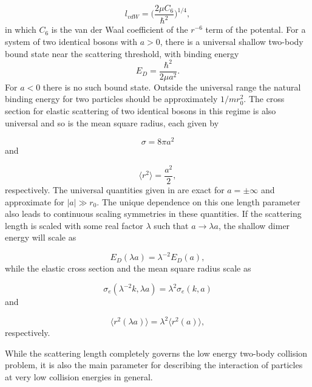 \documentclass{article}
\providecommand{\abs}[1]{\lvert#1\rvert} \providecommand{\norm}[1]{\lVert#1\rVert}
\numberwithin{equation}{section}
\numberwithin{figure}{section}
\begin{document}
\begin{equation}
l_{vdW} = \bigg(\frac{2\mu C_6}{\hbar^2}\bigg)^{1/4},
\end{equation}
in which $C_6$ is the van der Waal coefficient of the $r^{-6}$ term of the potental. For a system of two identical bosons with $a>0$, there is a universal shallow two-body bound state near the scattering threshold, with binding energy 
\begin{equation}\label{shallowdimer}
E_D = \frac{\hbar^2}{2 \mu a^2}.
\end{equation}
For $a<0$ there is no such bound state. Outside the universal range the natural binding energy for two particles should be approximately $1/mr_0^2$. The cross section for elastic scattering of two identical bosons in this regime is also universal and so is the mean square radius, each given by

\begin{equation}\label{elasticcross}
\sigma = 8\pi a^2
\end{equation}
and

\begin{equation}\label{meanradius}
\langle r^2\rangle = \frac{a^2}{2},
\end{equation}
respectively. The universal quantities given in  are exact for $a=\pm \infty$ and approximate for $\abs{a}\gg r_0$. The unique dependence on this one length parameter also leads to continuous scaling symmetries in these quantities. If the scattering length is scaled with some real factor $\lambda$ such that $a \to \lambda a$, the shallow dimer energy will scale as 

\begin{equation}
E_D(\lambda a) = \lambda^{-2}E_D(a),
\end{equation}    
while the elastic cross section and the mean square radius scale as 

\begin{equation}
\sigma_e(\lambda^{-2}k,\lambda a) = \lambda^2 \sigma_e(k,a)
\end{equation}
and

\begin{equation}
\langle r^2(\lambda a)\rangle = \lambda^2 \langle r^2(a)\rangle ,
\end{equation}
respectively. 

While the scattering length completely governs the low energy two-body collision problem, it is also the main parameter for describing the interaction of particles at very low collision energies in general. 
\end{document}
